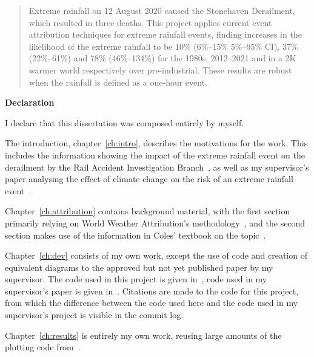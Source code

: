 \documentclass[12pt,a4paper,openany]{report}
\begin{document}
\newpage



\begin{abstract}

Extreme rainfall on 12 August 2020 caused the Stonehaven Derailment,
    which resulted in three deaths.
This project applies current event attribution techniques for extreme rainfall events,
    finding increases in the likelihood of the extreme rainfall to be 10\% (6\%--15\% 5\%--95\% CI),
    37\% (22\%--61\%) and 78\% (46\%--134\%) for the 1980s, 2012--2021 and in a 2K warmer world
    respectively over pre-industrial.
These results are robust when the rainfall is defined as a one-hour event.

\end{abstract}


\begin{center}
\textbf{Declaration}
\end{center}

I declare that this dissertation was composed entirely by myself.

The introduction, chapter~\ref{ch:intro}, describes the motivations for the work.
This includes the information showing the impact of the extreme rainfall event on the derailment by the Rail Accident Investigation Branch~\cite{RAIB_2022},
    as well as my supervisor's paper analysing the effect of climate change on the risk of an extreme rainfall event~\cite{Tett_Soon}.

Chapter~\ref{ch:attribution} contains background material,
    with the first section primarily relying on World Weather Attribution's methodology~\cite{van_Oldenborgh_et_al_2021},
    and the second section makes use of the information in Coles' textbook on the topic~\cite{Coles_2001}.

Chapter~\ref{ch:dev} consists of my own work,
    except the use of code and creation of equivalent diagrams to the approved but not yet published paper by my supervisor.
The code used in this project is given in~\cite{Me_Code},
    code used in my supervisor's paper is given in~\cite{Tett_Code}.
Citations are made to the code for this project,
    from which the difference between the code used here and the code used in my supervisor's project is visible in the commit log.

Chapter~\ref{ch:results} is entirely my own work,
    reusing large amounts of the plotting code from~\cite{Tett_Soon}.
\end{document}
